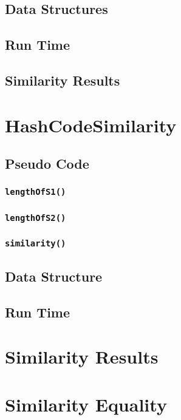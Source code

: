\documentclass[10pt,letterpaper]{article}
\begin{document}
\subsection{Data Structures }
\subsection{Run Time}
\subsection{Similarity Results}
\section{HashCodeSimilarity}
\subsection{Pseudo Code}
\subsubsection{\texttt{lengthOfS1()}}
\subsubsection{\texttt{lengthOfS2()}}
\subsubsection{\texttt{similarity()}}
\subsection{Data Structure }
\subsection{Run Time}
\section{Similarity Results}
\section{Similarity Equality}
\end{document}
